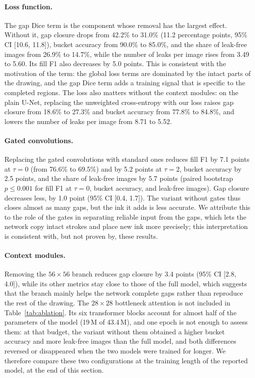 \documentclass[11pt]{article}
\begin{document}
\paragraph{Loss function.} The gap Dice term is the component whose removal has the
largest effect. Without it, gap closure drops from 42.2\% to 31.0\% (11.2 percentage
points, 95\% CI [10.6, 11.8]), bucket accuracy from 90.0\% to 85.0\%, and the share of
leak-free images from 26.9\% to 14.7\%, while the number of leaks per image rises from
3.49 to 5.60. Its fill F1 also decreases by 5.0 points. This is consistent with the
motivation of the term: the global loss terms are dominated by the intact parts of
the drawing, and the gap Dice term adds a training signal that is specific to the
completed regions. The loss also matters without the context modules: on the plain
U-Net, replacing the unweighted cross-entropy with our loss raises gap closure from
18.6\% to 27.3\% and bucket accuracy from 77.8\% to 84.8\%, and lowers the number of
leaks per image from 8.71 to 5.52.

\paragraph{Gated convolutions.} Replacing the gated convolutions with standard ones
reduces fill F1 by 7.1 points at $\tau=0$ (from 76.6\% to 69.5\%) and by 5.2 points at
$\tau=2$, bucket accuracy by 2.5 points, and the share of leak-free images by 5.7
points (paired bootstrap $p \le 0.001$ for fill F1 at $\tau=0$, bucket accuracy, and
leak-free images). Gap closure decreases less, by 1.0 point (95\% CI [0.4, 1.7]). The variant without gates thus closes almost as many gaps, but the ink it
adds is less accurate. We attribute this to the role of the gates in separating
reliable input from the gaps, which lets the network copy intact strokes and place new
ink more precisely; this interpretation is consistent with, but not proven by, these
results.

\paragraph{Context modules.} Removing the $56\times 56$ branch reduces gap closure by
3.4 points (95\% CI [2.8, 4.0]), while its other metrics stay close to those of the
full model, which suggests that the branch mainly helps the network complete gaps
rather than reproduce the rest of the drawing. The $28\times 28$ bottleneck attention
is not included in Table~\ref{tab:ablation}. Its six transformer blocks account for
almost half of the parameters of the model (19\,M of 43.4\,M), and one epoch is not
enough to assess them: at that budget, the variant without them obtained a higher
bucket accuracy and more leak-free images than the full model, and both differences
reversed or disappeared when the two models were trained for longer. We therefore
compare these two configurations at the training length of the reported model, at the
end of this section.
\end{document}
